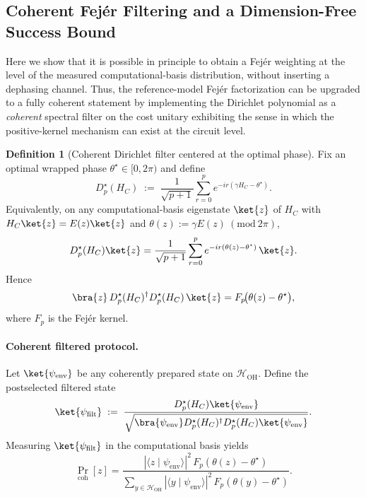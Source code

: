 \documentclass[a4paper,unpublished,onecolumn,11pt]{quantumarticle}
\theoremstyle{definition}
\newtheorem{definition}[theorem]{Definition}
\theoremstyle{remark}
\newcommand{\OH}{\mathcal{H}_{\mathrm{OH}}}
\begin{document}
\begin{appendix}
\section{Coherent Fej\'er Filtering and a Dimension-Free Success Bound}
\label{app:coherent-fejer}

Here we show that it is possible in principle to obtain a Fej\'er weighting at the level of the measured computational-basis distribution, without inserting a dephasing channel. Thus, the reference-model Fej\'er factorization can be upgraded to a fully coherent
statement by implementing the Dirichlet polynomial as a \emph{coherent} spectral filter on the cost unitary exhibiting the sense in which the positive-kernel mechanism can exist at the circuit level.

\begin{definition}[Coherent Dirichlet filter centered at the optimal phase]
\label{def:coherent-dirichlet-filter}
Fix an optimal wrapped phase $\theta^\star\in[0,2\pi)$ and define
\begin{equation}
\label{eq:coherent-dirichlet-filter}
D_p^\star(H_C)
\;:=\;
\frac{1}{\sqrt{p+1}}
\sum_{r=0}^{p} e^{-ir(\gamma H_C-\theta^\star)}.
\end{equation}
Equivalently, on any computational-basis eigenstate $\ket{z}$ of $H_C$ with
$H_C\ket{z}=E(z)\ket{z}$ and $\theta(z):=\gamma E(z)\ (\mathrm{mod}\ 2\pi)$,
\begin{equation}
\label{eq:coherent-dirichlet-eigenvalue}
D_p^\star(H_C)\ket{z}
=
\frac{1}{\sqrt{p+1}}
\sum_{r=0}^{p} e^{-ir(\theta(z)-\theta^\star)}\,\ket{z}.
\end{equation}
Hence
\begin{equation}
\label{eq:coherent-fejer-diagonal}
\bra{z}\,D_p^\star(H_C)^\dagger D_p^\star(H_C)\,\ket{z}
=
F_p\!\bigl(\theta(z)-\theta^\star\bigr),
\end{equation}
where $F_p$ is the Fej\'er kernel.
\end{definition}

\paragraph{Coherent filtered protocol.}
Let $\ket{\psi_{\mathrm{env}}}$ be any coherently prepared state on $\OH$. Define the postselected filtered state
\begin{equation}
\label{eq:coherent-filtered-state}
\ket{\psi_{\mathrm{filt}}}
\;:=\;
\frac{D_p^\star(H_C)\ket{\psi_{\mathrm{env}}}}
{\sqrt{\bra{\psi_{\mathrm{env}}}D_p^\star(H_C)^\dagger D_p^\star(H_C)\ket{\psi_{\mathrm{env}}}}}.
\end{equation}
Measuring $\ket{\psi_{\mathrm{filt}}}$ in the computational basis yields
\begin{equation}
\label{eq:coherent-filtered-law}
\Pr_{\mathrm{coh}}[z]
=
\frac{|\langle z\mid\psi_{\mathrm{env}}\rangle|^2\,F_p(\theta(z)-\theta^\star)}
{\sum_{y\in\OH}|\langle y\mid\psi_{\mathrm{env}}\rangle|^2\,F_p(\theta(y)-\theta^\star)}.
\end{equation}



\end{appendix}
\end{document}
